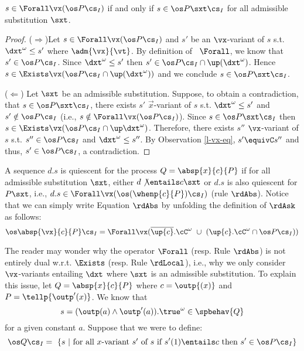 \documentclass{tlp}
\begin{document}
   \begin{proposition}\label{prop:forall-subs}
$s \in  \Forall \vx ( \os P \cs_I)$ if and only if  $s \in \os P\sxt \cs_I$ for all admissible substitution $\sxt$. 
\end{proposition}
\begin{proof}
($\Rightarrow$)Let $s\in\Forall \vx ( \os P \cs_I)$ and  $s'$ be an $\vx$-variant of $s$ s.t. $\dxt^\omega \leq s'$ where $\adm{\vx}{\vt}$. By definition of~ $\Forall$, we know that $s'\in \os P \cs_I$. Since $ \dxt^\omega \leq s'$ then $s' \in \os P \cs_I \cap \up(\dxt^\omega)$. Hence $s\in \Exists \vx (\os P \cs_I \cap \up(\dxt^\omega) )$ and we conclude $s\in \os P\sxt\cs_I$. 

\noindent($\Leftarrow$) Let $\sxt$ be an admissible substitution. Suppose, to obtain a contradiction, that $s \in \os P\sxt\cs_I$, there exists $s'$ $\vec{x}$-variant of $s$ s.t. $\dxt^\omega \leq s'$ and $s' \notin \os P\cs_I$ (i.e., $s\notin \Forall\vx (\os P\cs_I)$). Since $s\in \os P\sxt\cs_I$ then $s\in \Exists \vx (\os P \cs_I \cap \up \dxt^\omega)$.  Therefore, there exists $s''$ $\vx$-variant of $s$ s.t. $s'' \in \os P\cs_I$ and $\dxt^\omega \leq s''$. By Observation \ref{l-vx-eq},  $s'\equivC s''$ and thus,  $s' \in \os P \cs_I$, a contradiction. 
\end{proof}


   
A sequence $d.s$ is quiescent for  the process $Q=\absp{x}{c}{P}$   if for all admissible substitution $\sxt$, either $d \not\entails c\sxt $ or  $d.s$ is also quiescent for $P\sxt $, i.e., $d.s \in \Forall \vx  (\os (\whenp{c}{P})\cs_I)$ (rule $\rdAbs$).    Notice that we can simply write Equation $\rdAbs$ by unfolding the definition of $\rdAsk$ as follows:
\[
\os \absp{\vx}{c}{P}\cs_I = \Forall \vx(\overline{\up{c}}.\cC^\omega  \ \cup  \  (\up{c}.\cC^\omega \cap \os P \cs_I))
\]


 The reader may wonder why the operator $\Forall$ (resp. Rule $\rdAbs$) is not entirely  dual w.r.t. $\Exists$ (resp. Rule $\rdLocal$), i.e., why we only consider $\vx$-variants entailing $\dxt$ where $\sxt$ is an admissible substitution.   
 To explain this issue, let $Q = \absp{x}{c}{P}$ where $c=\outp{(x)}$ and $P=\tellp{\outp'(x)}$. We know that 
\[
s= (\outp(a) \wedge \outp'(a)).\true^\omega \in \spbehav{Q}
\]
 for a given constant $a$.  Suppose that we were to define:
\[
\os Q \cs_I =
{\
\{s \ |\  \mbox{for all $x$-variant $s'$ of $s$  if }   s'(1) \entails c \mbox{ then } s' \in \os P\cs_I\}
}
\]
\end{document}
